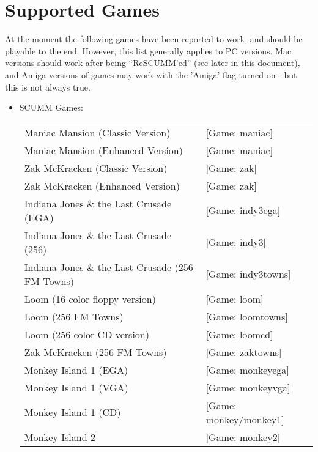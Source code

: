 


\section{Supported Games}

At the moment the following games have been reported to work, and should
be playable to the end. However, this list generally applies to PC versions.
Mac versions should work after being ``ReSCUMM'ed'' (see later in this document), and Amiga versions of games may work with the 'Amiga' flag turned on - but
this is not always true.\\
\begin{itemize}
\item SCUMM Games:\\
  \begin {tabular} [h] {ll}
    Maniac Mansion (Classic Version)&                [Game: maniac]\\
    Maniac Mansion (Enhanced Version)&               [Game: maniac]\\
    Zak McKracken (Classic Version)&                 [Game: zak]\\
    Zak McKracken (Enhanced Version)&                [Game: zak]\\
    Indiana Jones \& the Last Crusade (EGA)&          [Game: indy3ega]\\
    Indiana Jones \& the Last Crusade (256)&          [Game: indy3]\\
    Indiana Jones \& the Last Crusade (256 FM Towns)& [Game: indy3towns]\\
    Loom (16 color floppy version)&                  [Game: loom]\\
    Loom (256 FM Towns)&                             [Game: loomtowns]\\
    Loom (256 color CD version)&                     [Game: loomcd]\\
    Zak McKracken (256 FM Towns)&                    [Game: zaktowns]\\
    Monkey Island 1 (EGA)&                           [Game: monkeyega]\\
    Monkey Island 1 (VGA)&                           [Game: monkeyvga]\\
    Monkey Island 1 (CD)&                            [Game: monkey/monkey1]\\
    Monkey Island 2&                                 [Game: monkey2]\\

\end{tabular}
\end{itemize}
